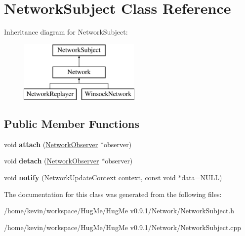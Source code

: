 \hypertarget{classNetworkSubject}{
\section{NetworkSubject Class Reference}
\label{classNetworkSubject}
}
Inheritance diagram for NetworkSubject:\begin{figure}[H]
\begin{center}
\leavevmode
\includegraphics[height=3cm]{classNetworkSubject}
\end{center}
\end{figure}
\subsection*{Public Member Functions}
\begin{DoxyCompactItemize}
\item 
\hypertarget{classNetworkSubject_a7dad1909bc12d5bba33ac9b935f39465}{
void {\bfseries attach} (\hyperlink{classNetworkObserver}{NetworkObserver} $\ast$observer)}
\label{classNetworkSubject_a7dad1909bc12d5bba33ac9b935f39465}

\item 
\hypertarget{classNetworkSubject_a9c2121db78ea8b1d1d3e3ab5e709a081}{
void {\bfseries detach} (\hyperlink{classNetworkObserver}{NetworkObserver} $\ast$observer)}
\label{classNetworkSubject_a9c2121db78ea8b1d1d3e3ab5e709a081}

\item 
\hypertarget{classNetworkSubject_abcf72266c492400152874107c6f2cc25}{
void {\bfseries notify} (NetworkUpdateContext context, const void $\ast$data=NULL)}
\label{classNetworkSubject_abcf72266c492400152874107c6f2cc25}

\end{DoxyCompactItemize}


The documentation for this class was generated from the following files:\begin{DoxyCompactItemize}
\item 
/home/kevin/workspace/HugMe/HugMe v0.9.1/Network/NetworkSubject.h\item 
/home/kevin/workspace/HugMe/HugMe v0.9.1/Network/NetworkSubject.cpp\end{DoxyCompactItemize}
